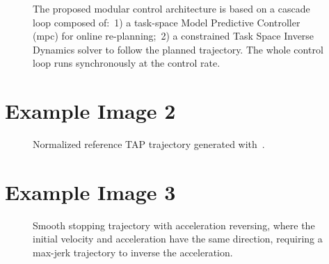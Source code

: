 \begin{figure}[tb]
\begin{adjustbox}{width=1\linewidth,center}
  \end{adjustbox}
  \caption{
    The proposed modular control architecture is based on a cascade loop
    composed of:~1) a task-space Model Predictive Controller (\gls{mpc}) for
    online \mbox{re-planning};~2) a constrained Task Space Inverse Dynamics
    solver to follow the planned trajectory. The whole control loop runs
    synchronously at the control rate.}
  \label{fig:example1}
\end{figure}


\section{Example Image 2}
\clearpage

\begin{figure}[thpb]
  \centering
  
  \caption{
  Normalized reference TAP trajectory generated with~\cite{berscheid2021jerk}.
}
  \label{fig:example2}
\end{figure}


\section{Example Image 3}
\clearpage
{}

\begin{figure}[thpb]
  \centering
  
  \caption{
    Smooth stopping trajectory with acceleration reversing, where the
    initial velocity and acceleration have the same direction, requiring a
    max-jerk trajectory to inverse the acceleration.}
  \label{fig:example3}
\end{figure}


